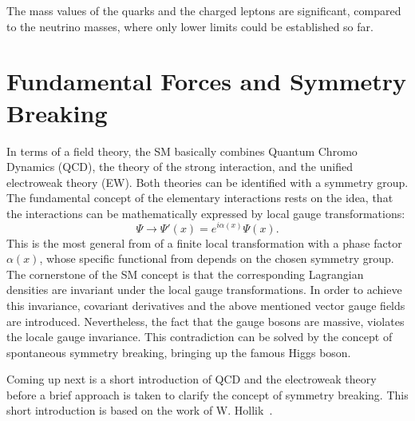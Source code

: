  The  mass values of the quarks and the charged leptons are significant, compared to the neutrino masses, where only lower limits could be established so far.
 
\vspace{0.1cm}




 


 
\section{Fundamental Forces and Symmetry Breaking}
In terms of a field theory, the SM basically combines Quantum Chromo Dynamics (QCD), the theory of the strong interaction, and the unified electroweak theory (EW). Both theories can be identified with a symmetry group.
The fundamental concept of the  elementary interactions rests on the idea, that the interactions can be mathematically expressed by  local gauge transformations:
\begin{equation}\label{trafo}
\Psi \longrightarrow \Psi'(x) =  e^{i\alpha(x)}\Psi(x).
\end{equation}  
This is the most general from of a finite local transformation with a phase factor $\alpha(x)$, whose specific functional from depends  on the chosen symmetry group. 
The cornerstone of the SM concept is that the corresponding Lagrangian densities are invariant under the local gauge transformations.  
In order to achieve this invariance, covariant derivatives  and the above mentioned vector gauge fields are introduced. Nevertheless, the fact that the gauge bosons are massive, violates the locale gauge invariance. This contradiction can be solved by the concept of spontaneous symmetry breaking, bringing up the famous Higgs boson.

 Coming up next is a short introduction of QCD and the electroweak theory before a brief approach is taken to clarify the concept of symmetry breaking. This short introduction is based on the work of W. Hollik~\cite{Hollik:2010id}. 

